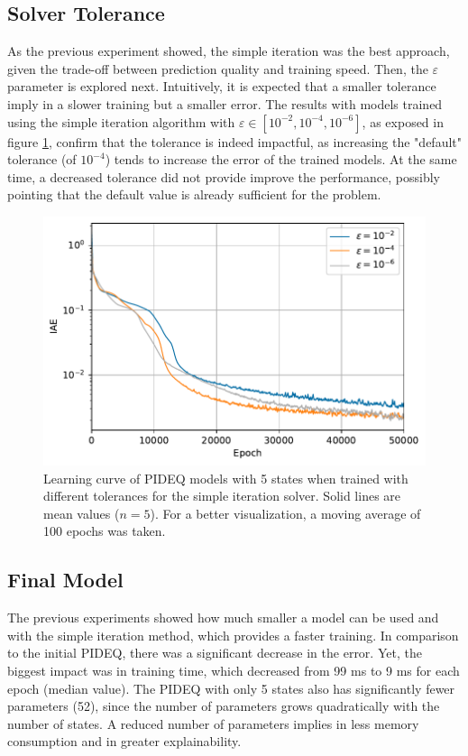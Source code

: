 \subsection{Solver Tolerance}

As the previous experiment showed, the simple iteration was the best approach, given the trade-off between prediction quality and training speed.
Then, the $\varepsilon$ parameter is explored next.
Intuitively, it is expected that a smaller tolerance imply in a slower training but a smaller error.
The results with models trained using the simple iteration algorithm with $\varepsilon \in \left[ 10^{-2}, 10^{-4},10^{-6} \right] $, as exposed in figure \ref{fig:epsilon-iae}, confirm that the tolerance is indeed impactful, as increasing the "default" tolerance (of $10^{-4}$) tends to increase the error of the trained models.
At the same time, a decreased tolerance did not provide improve the performance, possibly pointing that the default value is already sufficient for the problem.

\begin{figure}[h]
    \centering
    \includegraphics{images/exp_6_iae.pdf}
    \caption{Learning curve of \gls{PIDEQ} models with 5 states when trained with different tolerances for the simple iteration solver. Solid lines are mean values ($n=5$). For a better visualization, a moving average of 100 epochs was taken.}
    \label{fig:epsilon-iae}
\end{figure}

\subsection{Final Model}

The previous experiments showed how much smaller a model can be used and with the simple iteration method, which provides a faster training.
In comparison to the initial \gls{PIDEQ}, there was a significant decrease in the error.
Yet, the biggest impact was in training time, which decreased from 99 ms to 9 ms for each epoch (median value). 
The \gls{PIDEQ} with only 5 states also has significantly fewer parameters (52), since the number of parameters grows quadratically with the number of states.
A reduced number of parameters implies in less memory consumption and in greater explainability.

